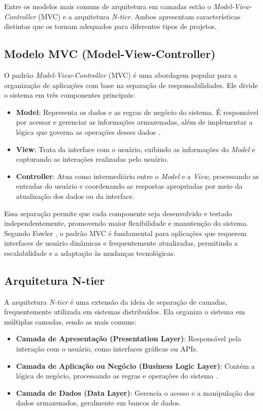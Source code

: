 Entre os modelos mais comuns de arquitetura em camadas estão o \textit{Model-View-Controller} (MVC) e a arquitetura \textit{N-tier}. Ambos apresentam características distintas que os tornam adequados para diferentes tipos de projetos.

\subsection{Modelo MVC (Model-View-Controller)}

O padrão \textit{Model-View-Controller} (MVC) é uma abordagem popular para a organização de aplicações com base na separação de responsabilidades. Ele divide o sistema em três componentes principais:

\begin{itemize}
    \item \textbf{Model}: Representa os dados e as regras de negócio do sistema. É responsável por acessar e gerenciar as informações armazenadas, além de implementar a lógica que governa as operações desses dados \cite{fowler2003}.
    \item \textbf{View}: Trata da interface com o usuário, exibindo as informações do \textit{Model} e capturando as interações realizadas pelo usuário.
    \item \textbf{Controller}: Atua como intermediário entre o \textit{Model} e a \textit{View}, processando as entradas do usuário e coordenando as respostas apropriadas por meio da atualização dos dados ou da interface.
\end{itemize}

Essa separação permite que cada componente seja desenvolvido e testado independentemente, promovendo maior flexibilidade e manutenção do sistema. Segundo Fowler \cite{fowler2003}, o padrão MVC é fundamental para aplicações que requerem interfaces de usuário dinâmicas e frequentemente atualizadas, permitindo a escalabilidade e a adaptação às mudanças tecnológicas.

\subsection{Arquitetura N-tier}

A arquitetura \textit{N-tier} é uma extensão da ideia de separação de camadas, frequentemente utilizada em sistemas distribuídos. Ela organiza o sistema em múltiplas camadas, sendo as mais comuns:

\begin{itemize}
    \item \textbf{Camada de Apresentação (Presentation Layer)}: Responsável pela interação com o usuário, como interfaces gráficas ou APIs.
    \item \textbf{Camada de Aplicação ou Negócio (Business Logic Layer)}: Contém a lógica de negócio, processando as regras e operações do sistema \cite{richards2015}.
    \item \textbf{Camada de Dados (Data Layer)}: Gerencia o acesso e a manipulação dos dados armazenados, geralmente em bancos de dados.
\end{itemize}

